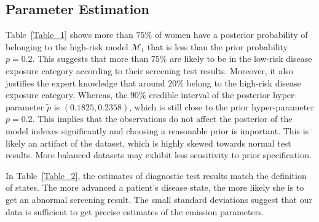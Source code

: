 \documentclass{article}
\begin{document}
\subsection{Parameter Estimation} \label{sec:pars}
Table~\ref{Table_1} shows more than $75\%$ of women have a posterior probability of belonging to the high-risk model $\mathcal{M}_1$ that is less than the prior probability $p = 0.2$. This suggests that more than $75\%$ are likely to be in the low-risk disease exposure category according to their screening test results. Moreover, it also justifies the expert knowledge that around $20\%$  belong to the high-risk disease exposure category. Whereas, the $90\%$ credible interval of the posterior hyper-parameter $\tilde{p}$ is $(0.1825, 0.2358)$, which is still close to the prior hyper-parameter $p = 0.2$. 
This implies that the observations do not affect the posterior of the model indexes significantly and choosing a reasonable prior is important.  This is likely an artifact of the dataset, which is highly skewed towards normal test results.  More balanced datasets may exhibit less sensitivity to prior specification. 

\begin{table}[ht!]
	\centering
	\caption{Maximum likelihood estimates of quantiles of the posterior probability for Model 1.}
	\label{Table_1}
\end{table}


In Table~\ref{Table_2}, the estimates of diagnostic test results match the definition of states. The more advanced a patient's disease state, the more likely she is to get an abnormal screening result. The small standard deviations suggest that our data is sufficient to get precise estimates of the emission parameters. 
\end{document}
